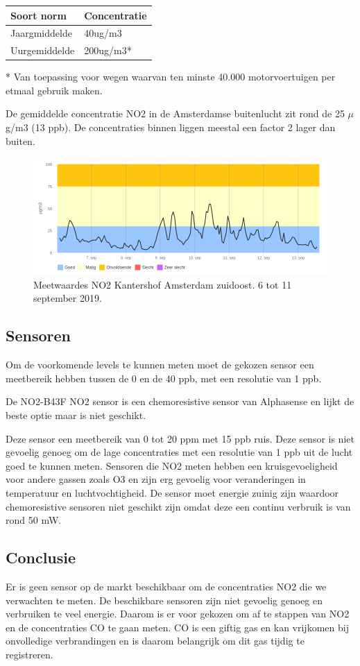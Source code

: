 \documentclass[a4paper, 11pt]{article} %
\begin{document}
\begin{center}
	\begin{tabular}{ | m{5cm} | m{5cm}| } 
		\hline
		Soort norm & Concentratie \\
		\hline
		Jaargmiddelde & 40ug/m3
		\\ 
		\hline
		Uurgemiddelde & 200ug/m3* 
		\\ 
		\hline
	\end{tabular}
\end{center}

* Van toepassing voor wegen waarvan ten minste 40.000 motorvoertuigen per etmaal gebruik maken.


De gemiddelde concentratie NO2 in de Amsterdamse buitenlucht zit rond de 25 $\mu$g/m3 (13 ppb). De concentraties binnen liggen meestal een factor 2 lager dan buiten. 

\begin{figure}
    \centering
    \includegraphics[width=.9\linewidth]{amsterdam.png}
    \caption{Meetwaardes NO2 Kantershof Amsterdam zuidoost. 6 tot 11 september 2019.}
    \label{fig:grafiek}
\end{figure}

\subsection{Sensoren}

Om de voorkomende levels te kunnen meten moet de gekozen sensor een meetbereik hebben tussen de 0 en de 40 ppb, met een resolutie van 1 ppb. 

De NO2-B43F NO2 sensor is een chemoresistive sensor van Alphasense en lijkt de beste optie maar is niet geschikt.

Deze sensor een meetbereik van 0 tot 20 ppm met 15 ppb ruis. Deze sensor is niet gevoelig genoeg om de lage concentraties met een resolutie van 1 ppb uit de lucht goed te kunnen meten. 
Sensoren die NO2 meten hebben een kruisgevoeligheid voor andere gassen zoals O3 en zijn erg gevoelig voor veranderingen in temperatuur en luchtvochtigheid. 
De sensor moet energie zuinig zijn waardoor chemoresistive sensoren niet geschikt zijn omdat deze een continu verbruik is van rond 50 mW. 

\subsection{Conclusie}
Er is geen sensor op de markt beschikbaar om de concentraties NO2 die we verwachten te meten. De beschikbare sensoren zijn niet gevoelig genoeg en verbruiken te veel energie. Daarom is er voor gekozen om af te stappen van NO2 en de concentraties CO te gaan meten. CO is een giftig gas en kan vrijkomen bij onvolledige verbrandingen en is daarom belangrijk om dit gas tijdig te registreren. 
\end{document}
